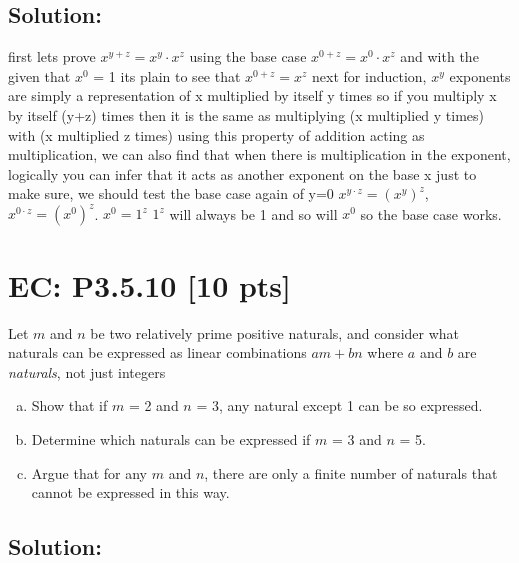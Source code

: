 \documentclass[12pt]{article}
\begin{document}
\subsection*{\textbf{Solution:}}
first lets prove $x^{y+z} = x^y \cdot x^z$\newline
using the base case $x^{0+z} = x^0 \cdot x^z$ and with the given that $x^0$ = 1 its plain to see that $x^{0+z} = x^z$\newline
next for induction, $x^y$ exponents are simply a representation of x multiplied by itself y times so if you multiply x by itself (y+z) times then it is the same as multiplying (x multiplied y times) with (x multiplied z times) using this property of addition acting as multiplication, we can also find that when there is multiplication in the exponent, logically you can infer that it acts as another exponent on the base x
just to make sure, we should test the base case again of y=0 $x^{y \cdot z} = (x^y)^z$, $x^{0 \cdot z} = (x^0)^z$. $x^0 = 1^z$
$1^z$ will always be 1 and so will $x^0$ so the base case works.
\newpage
\section*{\textbf{EC: P3.5.10} [10 pts]}
Let $m$ and $n$ be two relatively prime positive naturals, and consider what naturals can be expressed as linear combinations $am + bn$ where $a$ and $b$ are \textit{naturals}, not just integers
\begin{enumerate}[(a)]

    \item Show that if $m$ = 2 and $n$ = 3, any natural except 1 can be so expressed.

    \item Determine which naturals can be expressed if $m$ = 3 and $n$ = 5. 

    \item Argue that for any $m$ and $n$, there are only a finite number of naturals that cannot be expressed in this way.
    
\end{enumerate}

\subsection*{\textbf{Solution:}}
\end{document}
